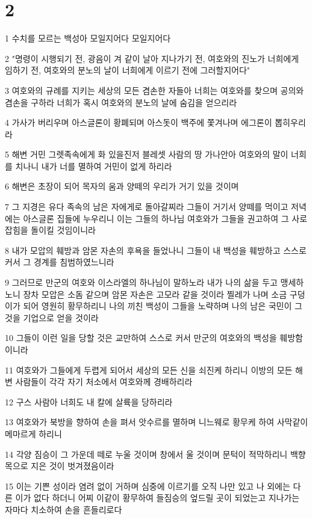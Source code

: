 \chapter{2}

\par 1 수치를 모르는 백성아 모일지어다 모일지어다
\par 2 "명령이 시행되기 전, 광음이 겨 같이 날아 지나가기 전, 여호와의 진노가 너희에게 임하기 전, 여호와의 분노의 날이 너희에게 이르기 전에 그러할지어다"
\par 3 여호와의 규례를 지키는 세상의 모든 겸손한 자들아 너희는 여호와를 찾으며 공의와 겸손을 구하라 너희가 혹시 여호와의 분노의 날에 숨김을 얻으리라
\par 4 가사가 버리우며 아스글론이 황폐되며 아스돗이 백주에 쫓겨나며 에그론이 뽑히우리라
\par 5 해변 거민 그렛족속에게 화 있을진저 블레셋 사람의 땅 가나안아 여호와의 말이 너희를 치나니 내가 너를 멸하여 거민이 없게 하리라
\par 6 해변은 초장이 되어 목자의 움과 양떼의 우리가 거기 있을 것이며
\par 7 그 지경은 유다 족속의 남은 자에게로 돌아갈찌라 그들이 거기서 양떼를 먹이고 저녁에는 아스글론 집들에 누우리니 이는 그들의 하나님 여호와가 그들을 권고하여 그 사로잡힘을 돌이킬 것임이니라
\par 8 내가 모압의 훼방과 암몬 자손의 후욕을 들었나니 그들이 내 백성을 훼방하고 스스로 커서 그 경계를 침범하였느니라
\par 9 그러므로 만군의 여호와 이스라엘의 하나님이 말하노라 내가 나의 삶을 두고 맹세하노니 장차 모압은 소돔 같으며 암몬 자손은 고모라 같을 것이라 찔레가 나며 소금 구덩이가 되어 영원히 황무하리니 나의 끼친 백성이 그들을 노략하며 나의 남은 국민이 그것을 기업으로 얻을 것이라
\par 10 그들이 이런 일을 당할 것은 교만하여 스스로 커서 만군의 여호와의 백성을 훼방함이니라
\par 11 여호와가 그들에게 두렵게 되어서 세상의 모든 신을 쇠진케 하리니 이방의 모든 해변 사람들이 각각 자기 처소에서 여호와께 경배하리라
\par 12 구스 사람아 너희도 내 칼에 살륙을 당하리라
\par 13 여호와가 북방을 향하여 손을 펴서 앗수르를 멸하며 니느웨로 황무케 하여 사막같이 메마르게 하리니
\par 14 각양 짐승이 그 가운데 떼로 누울 것이며 창에서 울 것이며 문턱이 적막하리니 백향목으로 지은 것이 벗겨졌음이라
\par 15 이는 기쁜 성이라 염려 없이 거하며 심중에 이르기를 오직 나만 있고 나 외에는 다른 이가 없다 하더니 어찌 이같이 황무하여 들짐승의 엎드릴 곳이 되었는고 지나가는 자마다 치소하여 손을 흔들리로다

